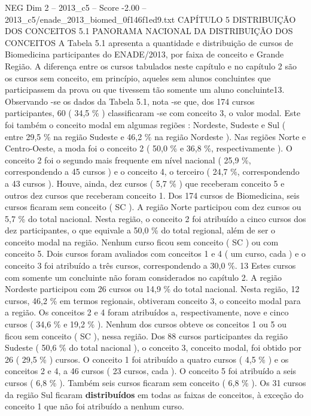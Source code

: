 \begin{textsample}{NEG Dim 2 – 2013\_c5 – Score -2.00 – 2013\_c5/enade\_2013\_biomed\_0f146f1ed9.txt}  \label{ex:f2_neg_067}
CAPÍTULO 5 DISTRIBUIÇÃO DOS CONCEITOS 5.1 PANORAMA NACIONAL DA DISTRIBUIÇÃO DOS CONCEITOS A Tabela 5.1 apresenta a quantidade e distribuição de cursos de Biomedicina participantes do ENADE/2013, por faixa de conceito e Grande Região.
A diferença entre os cursos tabulados neste capítulo e no capítulo 2 são os cursos sem conceito, em princípio, aqueles sem alunos concluintes que participassem da prova ou que tivessem tão somente um aluno concluinte13.
Observando -se os dados da Tabela 5.1, nota -se que, dos 174 cursos participantes, 60 ( 34,5 \% ) classificaram -se com conceito 3, o valor modal.
Este foi também o conceito modal em algumas regiões : Nordeste, Sudeste e Sul ( entre 29,5 \% na região Sudeste e 46,2 \% na região Nordeste ).
Nas regiões Norte e Centro-Oeste, a moda foi o conceito 2 ( 50,0 \% e 36,8 \%, respectivamente ).
O conceito 2 foi o segundo mais frequente em nível nacional ( 25,9 \%, correspondendo a 45 cursos ) e o conceito 4, o terceiro ( 24,7 \%, correspondendo a 43 cursos ).
Houve, ainda, dez cursos ( 5,7 \% ) que receberam conceito 5 e outros dez cursos que receberam conceito 1.
Dos 174 cursos de Biomedicina, seis cursos ficaram sem conceito ( SC ).
A região Norte participou com dez cursos ou 5,7 \% do total nacional.
Nesta região, o conceito 2 foi atribuído a cinco cursos dos dez participantes, o que equivale a 50,0 \% do total regional, além de ser o conceito modal na região.
Nenhum curso ficou sem conceito ( SC ) ou com conceito 5.
Dois cursos foram avaliados com conceitos 1 e 4 ( um curso, cada ) e o conceito 3 foi atribuído a três cursos, correspondendo a 30,0 \%. 13 Estes cursos com somente um concluinte não foram considerados no capítulo 2.
A região Nordeste participou com 26 cursos ou 14,9 \% do total nacional.
Nesta região, 12 cursos, 46,2 \% em termos regionais, obtiveram conceito 3, o conceito modal para a região.
Os conceitos 2 e 4 foram atribuídos a, respectivamente, nove e cinco cursos ( 34,6 \% e 19,2 \% ).
Nenhum dos cursos obteve os conceitos 1 ou 5 ou ficou sem conceito ( SC ), nessa região.
Dos 88 cursos participantes da região Sudeste ( 50,6 \% do total nacional ), o conceito 3, conceito modal, foi obtido por 26 ( 29,5 \% ) cursos.
O conceito 1 foi atribuído a quatro cursos ( 4,5 \% ) e os conceitos 2 e 4, a 46 cursos ( 23 cursos, cada ).
O conceito 5 foi atribuído a seis cursos ( 6,8 \% ).
Também seis cursos ficaram sem conceito ( 6,8 \% ).
Os 31 cursos da região Sul ficaram \textbf{distribuídos} em todas as faixas de conceitos, à exceção do conceito 1 que não foi atribuído a nenhum curso.

\end{textsample}
